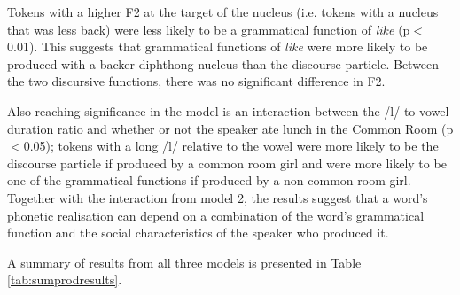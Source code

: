 Tokens with a higher F2 at the target of the nucleus (i.e. tokens with a nucleus that was less back) were less likely to be a grammatical function of \textit{like} (p$<$0.01).  This suggests that grammatical functions of \textit{like} were more likely to be produced with a backer diphthong nucleus than the discourse particle.  Between the two discursive functions, there was no significant difference in F2.

Also reaching significance in the model is an interaction between the /l/ to vowel duration ratio and whether or not the speaker ate lunch in the Common Room (p$<$0.05); tokens with a long /l/ relative to the vowel were more likely to be the discourse particle if produced by a common room girl and were more likely to be one of the grammatical functions if produced by a non-common room girl.  Together with the interaction from model 2, the results suggest that a word's phonetic realisation can depend on a combination of the word's grammatical function and the social characteristics of the speaker who produced it.


A summary of results from all three models is presented in Table \ref{tab:sumprodresults}.

